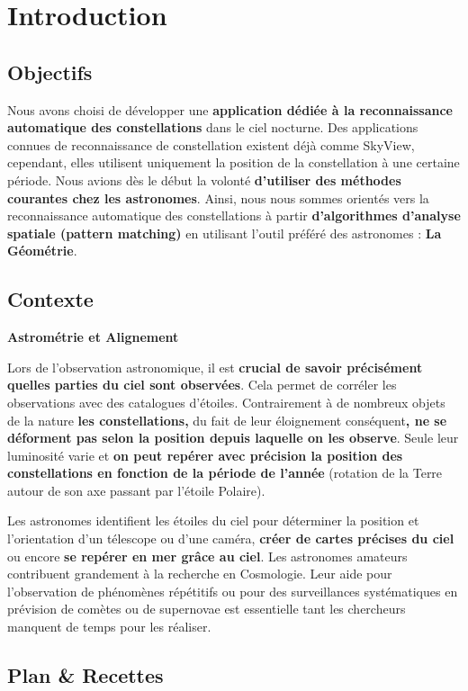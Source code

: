 \section{Introduction}
\subsection{Objectifs}

Nous avons choisi de développer une \textbf{application dédiée à la reconnaissance automatique des constellations} dans le ciel nocturne. Des applications connues de reconnaissance de constellation existent déjà comme SkyView, cependant, elles utilisent uniquement la position de la constellation à une certaine période. Nous avions dès le début la volonté \textbf{d'utiliser des méthodes courantes chez les astronomes}. Ainsi, nous nous sommes orientés vers la reconnaissance automatique des constellations à partir \textbf{d’algorithmes d’analyse spatiale (pattern matching)} en utilisant l'outil préféré des astronomes : \textbf{La Géométrie}.

\subsection{Contexte}
\textbf{Astrométrie et Alignement}

\noindent Lors de l'observation astronomique, il est \textbf{crucial de savoir précisément quelles parties du ciel sont observées}. Cela permet de corréler les observations avec des catalogues d'étoiles. Contrairement à de nombreux objets de la nature \textbf{les constellations,} du fait de leur éloignement conséquent\textbf{, ne se déforment pas selon la position depuis laquelle on les observe}. Seule leur luminosité varie et  \textbf{on peut repérer avec précision la position des constellations en fonction de la période de l'année} (rotation de la Terre autour de son axe passant par l'étoile Polaire). 

\noindent Les astronomes identifient les étoiles du ciel pour déterminer la position et l'orientation d'un télescope ou d'une caméra, \textbf{créer de cartes précises du ciel} ou encore \textbf{se repérer en mer grâce au ciel}. Les astronomes amateurs contribuent grandement à la recherche en Cosmologie. Leur aide pour l’observation de phénomènes répétitifs ou pour des surveillances systématiques en prévision de comètes ou de supernovae est essentielle tant les chercheurs manquent de temps pour les réaliser.

\subsection{Plan \& Recettes}  

